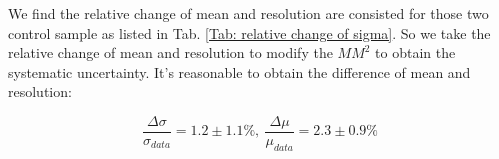 \begin{table}[htbp]
    \caption{Difference between data and MC.}
    \label{Tab: difference between data and MC}
\end{table}

We find the relative change of mean and resolution are consisted for
those two control sample as listed in Tab. \ref{Tab: relative change of
sigma}. So we take the relative change of mean and resolution to modify
the $MM^{2}$ to obtain the systematic uncertainty. It's reasonable to
obtain the difference of mean and resolution: 

\begin{equation}
    \frac{\Delta \sigma}{\sigma_{data}} = 1.2 \pm 1.1 \%,~\frac{\Delta \mu}{\mu_{data}}= 2.3 \pm 0.9 \%
    \label{Eq: result of dSigma}
\end{equation}
    
\begin{table}[htbp]
        \caption{The relative change of mean and resolution for data and MC}
        \label{Tab: relative change of sigma}
        \centering
\end{table}

